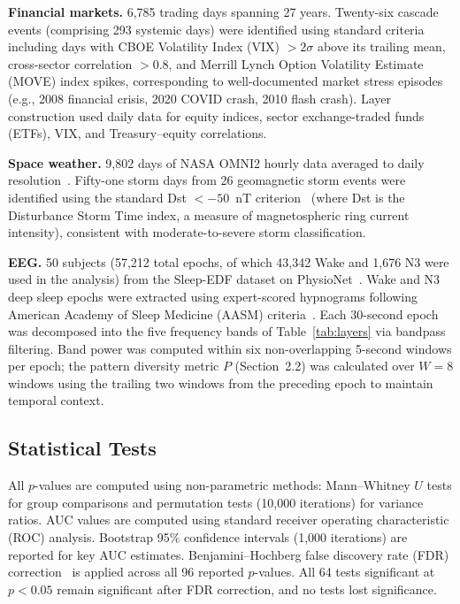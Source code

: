 \documentclass[aip,cha,reprint,amsmath,amssymb,final]{revtex4-2}
\begin{document}
\textbf{Financial markets.} 6,785 trading days spanning 27 years. Twenty-six cascade events (comprising 293 systemic days) were identified using standard criteria including days with CBOE Volatility Index (VIX) $> 2\sigma$ above its trailing mean, cross-sector correlation $> 0.8$, and Merrill Lynch Option Volatility Estimate (MOVE) index spikes, corresponding to well-documented market stress episodes (e.g., 2008 financial crisis, 2020 COVID crash, 2010 flash crash). Layer construction used daily data for equity indices, sector exchange-traded funds (ETFs), VIX, and Treasury--equity correlations.

\textbf{Space weather.} 9,802 days of NASA OMNI2 hourly data averaged to daily resolution~\cite{papitashvili2020}. Fifty-one storm days from 26 geomagnetic storm events were identified using the standard Dst $< -50$~nT criterion~\cite{gonzalez1994} (where Dst is the Disturbance Storm Time index, a measure of magnetospheric ring current intensity), consistent with moderate-to-severe storm classification.

\textbf{EEG.} 50 subjects (57,212 total epochs, of which 43,342 Wake and 1,676 N3 were used in the analysis) from the Sleep-EDF dataset on PhysioNet~\cite{kemp2000,goldberger2000}. Wake and N3 deep sleep epochs were extracted using expert-scored hypnograms following American Academy of Sleep Medicine (AASM) criteria~\cite{berry2017}. Each 30-second epoch was decomposed into the five frequency bands of Table~\ref{tab:layers} via bandpass filtering. Band power was computed within six non-overlapping 5-second windows per epoch; the pattern diversity metric $P$ (Section~2.2) was calculated over $W = 8$ windows using the trailing two windows from the preceding epoch to maintain temporal context.

\subsection{Statistical Tests}

All $p$-values are computed using non-parametric methods: Mann--Whitney $U$ tests for group comparisons and permutation tests (10,000 iterations) for variance ratios. AUC values are computed using standard receiver operating characteristic (ROC) analysis. Bootstrap 95\% confidence intervals (1,000 iterations) are reported for key AUC estimates. Benjamini--Hochberg false discovery rate (FDR) correction~\cite{benjamini1995} is applied across all 96 reported $p$-values. All 64 tests significant at $p < 0.05$ remain significant after FDR correction, and no tests lost significance.
\end{document}
